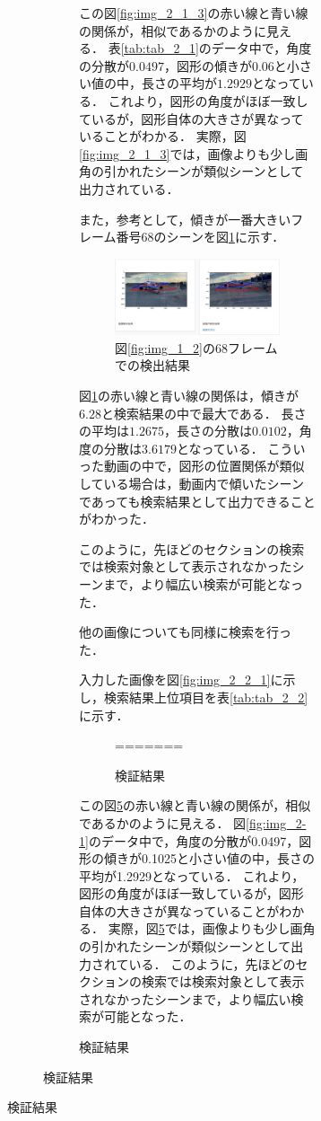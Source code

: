 \documentclass[a4j,12pt,dvipdfmx]{jreport}
\begin{document}
\begin{figure}[H]
\begin{figure}[H]
\begin{figure}[H]
この図\ref{fig:img_2_1_3}の赤い線と青い線の関係が，相似であるかのように見える．
表\ref{tab:tab_2_1}のデータ中で，角度の分散が$0.0497$，図形の傾きが$0.06$と小さい値の中，長さの平均が$1.2929$となっている．
これより，図形の角度がほぼ一致しているが，図形自体の大きさが異なっていることがわかる．
実際，図\ref{fig:img_2_1_3}では，画像よりも少し画角の引かれたシーンが類似シーンとして出力されている．

また，参考として，傾きが一番大きいフレーム番号68のシーンを図\ref{fig:img_2_1_4}に示す．
\begin{figure}[H]
  \centering
  \includegraphics[width=13cm]{image/result_2_1_4.jpg}
  \caption{図\ref{fig:img_1_2}の68フレームでの検出結果}
  \label{fig:img_2_1_4}
\end{figure}

図\ref{fig:img_2_1_4}の赤い線と青い線の関係は，傾きが$6.28$と検索結果の中で最大である．
長さの平均は$1.2675$，長さの分散は$0.0102$，角度の分散は$3.6179$となっている．
こういった動画の中で，図形の位置関係が類似している場合は，動画内で傾いたシーンであっても検索結果として出力できることがわかった．

このように，先ほどのセクションの検索では検索対象として表示されなかったシーンまで，より幅広い検索が可能となった．

他の画像についても同様に検索を行った．

入力した画像を図\ref{fig:img_2_2_1}に示し，検索結果上位項目を表\ref{tab:tab_2_2}に示す．

\begin{figure}[H]
=======
  \caption{検証結果}
  \label{fig:img_2-1-3}
\end{figure}

この図\ref{fig:img_2-1-3}の赤い線と青い線の関係が，相似であるかのように見える．
図\ref{fig:img_2-1}のデータ中で，角度の分散が0.0497，図形の傾きが0.1025と小さい値の中，長さの平均が1.2929となっている．
これより，図形の角度がほぼ一致しているが，図形自体の大きさが異なっていることがわかる．
実際，図\ref{fig:img_2-1-3}では，画像よりも少し画角の引かれたシーンが類似シーンとして出力されている．
このように，先ほどのセクションの検索では検索対象として表示されなかったシーンまで，より幅広い検索が可能となった．


\end{figure}
\end{figure}
\end{figure}
\end{document}
